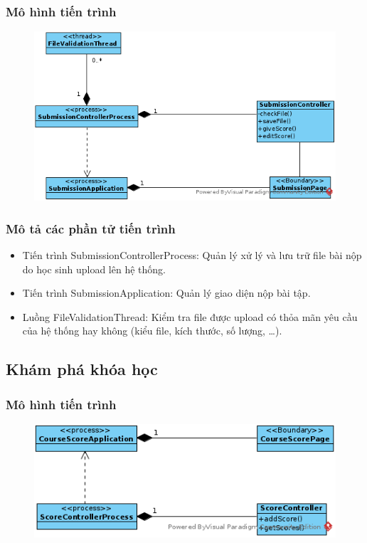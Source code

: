 \documentclass[./../main.tex]{subfiles}
\begin{document}
\subsubsection{Mô hình tiến trình}

\begin{figure}[H]
	\centering
	\includegraphics[width=\linewidth]{./images/pv_submit_assignment.png}
\end{figure}

\subsubsection{Mô tả các phần tử tiến trình}

\begin{itemize}
	\item Tiến trình SubmissionControllerProcess: Quản lý xử lý và lưu trữ file bài nộp do học sinh upload lên hệ thống.
	\item Tiến trình SubmissionApplication: Quản lý giao diện nộp bài tập.
	\item Luồng FileValidationThread: Kiểm tra file được upload có thỏa mãn yêu cầu của hệ thống hay không (kiểu file, kích thước, số lượng, …).
\end{itemize}

\subsection{Khám phá khóa học}

\subsubsection{Mô hình tiến trình}

\begin{figure}[H]
	\centering
	\includegraphics[width=\linewidth]{./images/pv_check_course_progress.png}
\end{figure}
\end{document}
